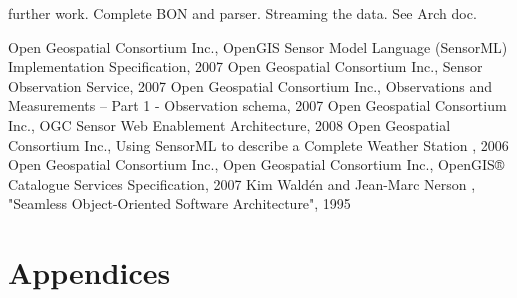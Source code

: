 \documentclass[]{final_report}
\begin{document}
further work.
Complete BON and parser.
Streaming the data. See Arch doc.

\newpage
\begin{thebibliography}{99}
Open Geospatial Consortium Inc., OpenGIS Sensor Model Language (SensorML) Implementation Specification, 2007
Open Geospatial Consortium Inc.,  Sensor Observation Service, 2007
Open Geospatial Consortium Inc., Observations and Measurements – Part 1 - Observation schema, 2007
Open Geospatial Consortium Inc., OGC Sensor Web Enablement Architecture, 2008
Open Geospatial Consortium Inc., Using SensorML to describe a
Complete Weather Station , 2006
Open Geospatial Consortium Inc.,
Open Geospatial Consortium Inc., OpenGIS® Catalogue Services Specification, 2007
Kim Waldén and Jean-Marc Nerson , "Seamless Object-Oriented Software Architecture", 1995
\end{thebibliography}
\label{endpage}


\chapter{Appendices}


\end{document}
